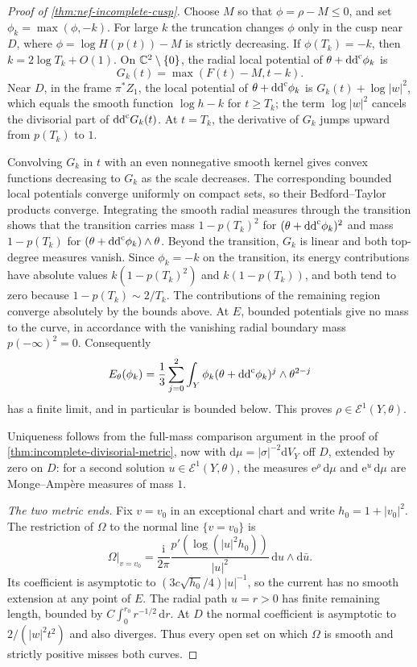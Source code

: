 \begin{proof}[Proof of \cref{thm:nef-incomplete-cusp}]
Choose $M$ so that $\phi=\rho-M\leq0$, and set $\phi_k=\max(\phi,-k)$. For large $k$ the truncation changes $\phi$ only in the cusp near $D$, where $\phi=\log H(p(t))-M$ is strictly decreasing. If $\phi(T_k)=-k$, then $k=2\log T_k+O(1)$. On $\mathbb C^2\setminus\{0\}$, the radial local potential of $\theta+\mathrm{dd}^{\mathrm{c}}\phi_k$ is
\[
 G_k(t)=\max(F(t)-M,t-k).
\]
Near $D$, in the frame $\pi^*Z_1$, the local potential of $\theta+\mathrm{dd}^{\mathrm{c}}\phi_k$ is $G_k(t)+\log|w|^2$, which equals the smooth function $\log h-k$ for $t\geq T_k$; the term $\log|w|^2$ cancels the divisorial part of $\mathrm{dd}^{\mathrm{c}} G_k(t)$. At $t=T_k$, the derivative of $G_k$ jumps upward from $p(T_k)$ to $1$.

Convolving $G_k$ in $t$ with an even nonnegative smooth kernel gives convex functions decreasing to $G_k$ as the scale decreases. The corresponding bounded local potentials converge uniformly on compact sets, so their Bedford--Taylor products converge. Integrating the smooth radial measures through the transition shows that the transition carries mass $1-p(T_k)^2$ for $(\theta+\mathrm{dd}^{\mathrm{c}}\phi_k)^2$ and mass $1-p(T_k)$ for $(\theta+\mathrm{dd}^{\mathrm{c}}\phi_k)\wedge\theta$. Beyond the transition, $G_k$ is linear and both top-degree measures vanish. Since $\phi_k=-k$ on the transition, its energy contributions have absolute values $k(1-p(T_k)^2)$ and $k(1-p(T_k))$, and both tend to zero because $1-p(T_k)\sim2/T_k$. The contributions of the remaining region converge absolutely by the bounds above. At $E$, bounded potentials give no mass to the curve, in accordance with the vanishing radial boundary mass $p(-\infty)^2=0$. Consequently
\[
 E_\theta(\phi_k)=\frac13\sum_{j=0}^2
       \int_Y\phi_k(\theta+\mathrm{dd}^{\mathrm{c}}\phi_k)^j\wedge\theta^{2-j}
\]
has a finite limit, and in particular is bounded below. This proves $\rho\in\mathcal E^1(Y,\theta)$.

Uniqueness follows from the full-mass comparison argument in the proof of \cref{thm:incomplete-divisorial-metric}, now with $\mathrm{d}\mu=|\sigma|^{-2}\mathrm{d}V_Y$ off $D$, extended by zero on $D$: for a second solution $u\in\mathcal E^1(Y,\theta)$, the measures $\mathrm{e}^{\rho}\,\mathrm{d}\mu$ and $\mathrm{e}^{u}\,\mathrm{d}\mu$ are Monge--Amp\`ere measures of mass $1$.

\emph{The two metric ends.}
Fix $v=v_0$ in an exceptional chart and write $h_0=1+|v_0|^2$. The restriction of $\Omega$ to the normal line $\{v=v_0\}$ is
\[
 \Omega|_{v=v_0}=\frac{\mathrm{i}}{2\pi}
       \frac{p'(\log(|u|^2h_0))}{|u|^2}
       \,\mathrm{d}u\wedge\mathrm{d}\bar u.
\]
Its coefficient is asymptotic to $(3c\sqrt{h_0}/4)|u|^{-1}$, so the current has no smooth extension at any point of $E$. The radial path $u=r>0$ has finite remaining length, bounded by $C\int_0^{r_0}r^{-1/2}\,\mathrm{d}r$. At $D$ the normal coefficient is asymptotic to $2/(|w|^2t^2)$ and also diverges. Thus every open set on which $\Omega$ is smooth and strictly positive misses both curves.


\end{proof}
